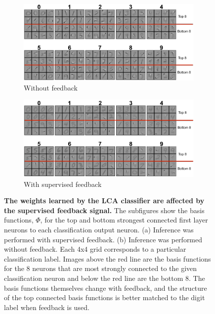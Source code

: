 \begin{figure}\label{fig:ch3_feedback_nofeedback_features}
    \centering
    \begin{subfigure}[b]{0.5\textwidth}\label{fig:ch3_nofeedback_features}
      \includegraphics[width=\textwidth]{figures/lca_nofeedback_classifier_features.png}
      \caption{Without feedback}
    \end{subfigure}
    \begin{subfigure}[b]{0.5\textwidth}\label{fig:ch3_feedback_features}
      \includegraphics[width=\textwidth]{figures/lca_feedback_classifier_features.png}
      \caption{With supervised feedback}
    \end{subfigure}
    \caption{\textbf{The weights learned by the LCA classifier are affected by the supervised feedback signal.} The subfigures show the basis functions, $\Phi$, for the top and bottom strongest connected first layer neurons to each classification output neuron. (a) Inference was performed with supervised feedback. (b) Inference was performed without feedback. Each 4x4 grid corresponds to a particular classification label. Images above the red line are the basis functions for the 8 neurons that are most strongly connected to the given classification neuron and below the red line are the bottom 8. The basis functions themselves change with feedback, and the structure of the top connected basis functions is better matched to the digit label when feedback is used.}
\end{figure}

